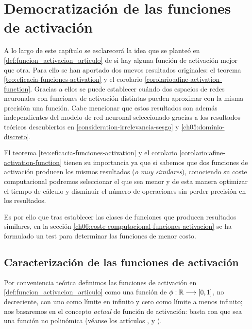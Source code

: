 
\chapter{Democratización de las funciones de activación}
\label{funciones-activacion-democraticas-mas-demoscraticas}
A lo largo de este capítulo se esclarecerá la idea
que se planteó en \ref{def:funcion_activacion_articulo}
de si 
hay alguna función de activación mejor que otra. 
Para ello 
se han aportado dos nuevos resultados originales: 
el teorema \ref{teo:eficacia-funciones-activation} 
y el corolario \ref{corolario:afine-activation-function}.
Gracias a ellos se puede establecer cuándo 
dos espacios de redes neuronales con funciones de activación distintas pueden aproximar
con la misma precisión una función. Cabe mencionar 
que estos resultados son además independientes del modelo de red neuronal seleccionado gracias a los resultados teóricos descubiertos en \ref{consideration-irrelevancia-sesgo} y \ref{ch05:dominio-discreto}.

El teorema \ref{teo:eficacia-funciones-activation} 
y el corolario \ref{corolario:afine-activation-function}  tienen su importancia ya que
si sabemos que dos funciones de activación producen 
los mismos resultados (\textit{o muy similares}), 
conociendo su coste computacional podremos seleccionar 
el que sea menor y de esta manera optimizar el tiempo 
de cálculo y disminuir el número de operaciones sin 
perder precisión en los resultados.  

Es por ello que 
tras establecer las clases de funciones que producen 
resultados similares, en la sección \ref{ch06:coste-computacional-funciones-activacion}
se ha formulado un test para
determinar las funciones de menor costo. 





\section{Caracterización de las funciones de activación}  

Por conveniencia teórica definimos las funciones de activación en \ref{def:funcion_activacion_articulo}
como una función de $\phi:\mathbb{R} \longrightarrow [0,1]$, no 
decreciente, con uno como límite en infinito y cero como límite a 
menos infinito; nos basaremos en el concepto \textit{actual} de función de activación:
basta con que sea una función no polinómica
(véanse  los artículos \cite{DBLP:journals/corr/SonodaM15}, \cite{modern-trainable-activation-functions} y \cite{FUNAHASHI1989183}).

